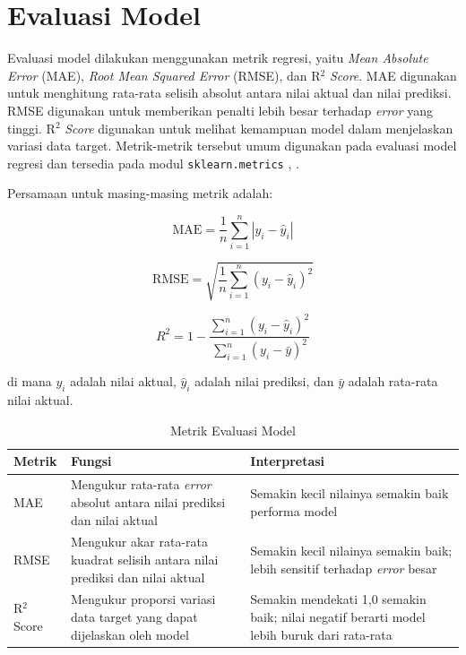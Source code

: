\section{Evaluasi Model}

Evaluasi model dilakukan menggunakan metrik regresi, yaitu \textit{Mean
Absolute Error} (MAE), \textit{Root Mean Squared Error} (RMSE), dan R$^2$
\textit{Score}. MAE digunakan untuk menghitung rata-rata selisih absolut
antara nilai aktual dan nilai prediksi. RMSE digunakan untuk memberikan
penalti lebih besar terhadap \textit{error} yang tinggi. R$^2$
\textit{Score} digunakan untuk melihat kemampuan model dalam menjelaskan
variasi data target. Metrik-metrik tersebut umum digunakan pada evaluasi
model regresi dan tersedia pada modul \texttt{sklearn.metrics}
\cite{sklearn_mae}, \cite{sklearn_r2}.

Persamaan untuk masing-masing metrik adalah:

\begin{equation}
\text{MAE} = \frac{1}{n} \sum_{i=1}^{n} |y_i - \hat{y}_i|
\label{eq:mae}
\end{equation}

\begin{equation}
\text{RMSE} = \sqrt{\frac{1}{n} \sum_{i=1}^{n} (y_i - \hat{y}_i)^2}
\label{eq:rmse}
\end{equation}

\begin{equation}
R^2 = 1 - \frac{\sum_{i=1}^{n}(y_i - \hat{y}_i)^2}
               {\sum_{i=1}^{n}(y_i - \bar{y})^2}
\label{eq:r2}
\end{equation}

di mana $y_i$ adalah nilai aktual, $\hat{y}_i$ adalah nilai prediksi, dan
$\bar{y}$ adalah rata-rata nilai aktual.

\begin{table}[H]
\centering
\caption{Metrik Evaluasi Model}
\label{tab:metrik}
\begin{tabularx}{\textwidth}{l X X}
\toprule
\textbf{Metrik} & \textbf{Fungsi} & \textbf{Interpretasi} \\
\midrule
MAE         & Mengukur rata-rata \textit{error} absolut antara nilai prediksi dan nilai aktual         & Semakin kecil nilainya semakin baik performa model \\
RMSE        & Mengukur akar rata-rata kuadrat selisih antara nilai prediksi dan nilai aktual           & Semakin kecil nilainya semakin baik; lebih sensitif terhadap \textit{error} besar \\
R$^2$ Score & Mengukur proporsi variasi data target yang dapat dijelaskan oleh model                  & Semakin mendekati 1,0 semakin baik; nilai negatif berarti model lebih buruk dari rata-rata \\
\bottomrule
\end{tabularx}
\end{table}

